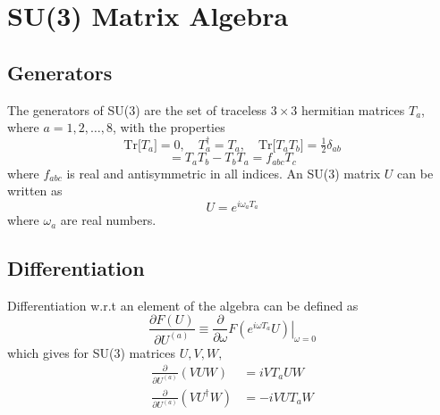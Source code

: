 \documentclass[a4paper,12pt]{article}
\newcommand{\tr}[1]{\text{Tr}\big[#1\big]}
\begin{document}
\newpage
\appendix
\section{SU(3) Matrix Algebra}

\subsection{Generators}
The generators of SU(3) are the set of traceless $3\times 3$ hermitian matrices $T_a$, where $a=1,2,\ldots,8$, with the properties
\begin{equation}
\tr{T_a}=0, \quad T_a^{\dagger}=T_a, \quad \tr{T_a T_b} = \tfrac{1}{2}\delta_{ab}
\end{equation}
\begin{equation}
[T_a,T_b] = T_a T_b - T_b T_a = f_{abc} T_c
\end{equation}
where $f_{abc}$ is real and antisymmetric in all indices. An SU(3) matrix $U$ can be written as
\begin{equation}
U = e^{i \omega_a T_a}
\end{equation}
where $\omega_a$ are real numbers.

\subsection{Differentiation}
Differentiation w.r.t an element of the algebra can be defined as
\begin{equation}
\frac{\partial F(U)}{\partial U^{(a)}} \equiv \frac{\partial}{\partial \omega} \left. F(e^{i \omega T_a} U) \right|_{\omega=0}
\end{equation}
which gives for SU(3) matrices $U, V, W,$
\begin{align}
\frac{\partial}{\partial U^{(a)}} \left( V U W \right) &= i V T_a U W \\
\frac{\partial}{\partial U^{(a)}} \left( V U^{\dagger} W \right) &= -i V U T_a W
\end{align}
\end{document}
